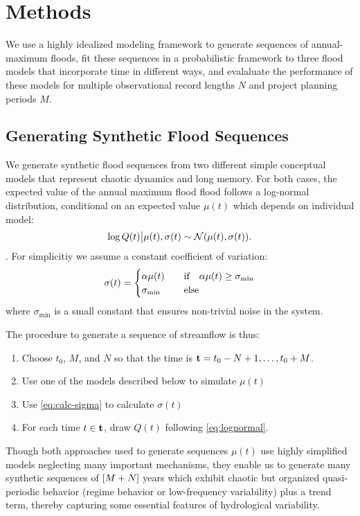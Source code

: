 \documentclass[12pt]{article}
\begin{document}

\section{Methods}\label{sec:methods}

We use a highly idealized modeling framework to generate sequences of annual-maximum floods, fit these sequences in a probabilistic framework to three flood models that incorporate time in different ways, and evalaluate the performance of these models for multiple observational record lengths \(N\) and project planning periods \(M\).

\subsection{Generating Synthetic Flood Sequences\label{sec:methods-generating}}

We generate synthetic flood sequences from two different simple conceptual models that represent chaotic dynamics and long memory.
For both cases, the expected value of the annual maximum flood flood follows a log-normal distribution, conditional on an expected value \(\mu(t)\) which depends on individual model:
\begin{equation} \label{eq:lognormal}
  \log Q(t) \big| \mu(t),\sigma(t) \sim \mathcal{N} \qty(\mu(t), \sigma(t)).
\end{equation}.
For simplicitiy we assume a constant coefficient of variation:
\begin{equation}\label{eq:calc-sigma}
  \sigma(t) = 
  \begin{cases} 
    \alpha \mu(t) & \qqtext{if} \alpha \mu(t) \geq \sigma_\text{min} \\ 
    \sigma_\text{min} & \qqtext{else}
  \end{cases}
\end{equation}
where \(\sigma_\text{min}\) is a small constant that ensures non-trivial noise in the system.

The procedure to generate a sequence of streamflow is thus:
\begin{enumerate}
  \item Choose \(t_0\), \(M\), and \(N\) so that the time is \(\vb{t}=t_0-N+1, \ldots, t_0+M\).
  \item Use one of the models described below to simulate \(\mu(t)\)
  \item Use \cref{eq:calc-sigma} to calculate \(\sigma(t)\)
  \item For each time \(t \in \vb{t}\), draw \(Q(t)\) following \cref{eq:lognormal}.
\end{enumerate}
Though both approaches used to generate sequences \( \mu(t) \) use highly simplified models neglecting many important mechanisms, they enable us to generate many synthetic sequences of \(\qty[M + N]\) years which exhibit chaotic but organized quasi-periodic behavior (regime behavior or low-frequency variability) plus a trend term, thereby capturing some essential features of hydrological variability.
\end{document}

